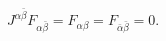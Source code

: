 \begin{equation}
   J^{\alpha\bar \beta}F_{\alpha\bar \beta}
      = F_{\alpha\beta} = F_{\bar \alpha \bar \beta} = 0 .
\end{equation}

